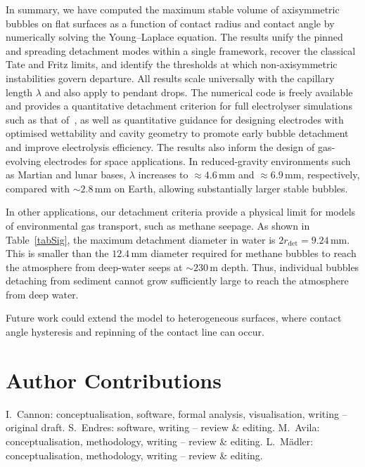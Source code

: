 \documentclass[9pt]{extarticle}
\begin{document}
In summary, we have computed the maximum stable volume of axisymmetric bubbles on flat surfaces as a function of contact radius and contact angle by numerically solving the Young--Laplace equation. The results unify the pinned and spreading detachment modes within a single framework, recover the classical Tate and Fritz limits, and identify the thresholds at which non-axisymmetric instabilities govern departure. All results scale universally with the capillary length $\lambda$ and also apply to pendant drops. The numerical code is freely available\cite{cannon26bubble} and provides a quantitative detachment criterion for full electrolyser simulations such as that of~\citet{ross26transient}, as well as quantitative guidance for designing electrodes with optimised wettability and cavity geometry to promote early bubble detachment and improve electrolysis efficiency\cite{raman25electrolytic,penas19decoupling}. The results also inform the design of gas-evolving electrodes for space applications. In reduced-gravity environments such as Martian and lunar bases, $\lambda$ increases to $\approx4.6\,\mathrm{mm}$ and $\approx6.9\,\mathrm{mm}$, respectively, compared with $\sim2.8\,\mathrm{mm}$ on Earth, allowing substantially larger stable bubbles.

In other applications, our detachment criteria provide a physical limit for models of environmental gas transport, such as methane seepage. As shown in Table~\ref{tabSig}, the maximum detachment diameter in water is $2r_\mathrm{det}=9.24\,\mathrm{mm}$. This is smaller than the $12.4\,\mathrm{mm}$ diameter required for methane bubbles to reach the atmosphere from deep-water seeps at $\sim230\,\mathrm{m}$ depth\cite{mcginnis06fate}. Thus, individual bubbles detaching from sediment cannot grow sufficiently large to reach the atmosphere from deep water.

Future work could extend the model to heterogeneous surfaces, where contact angle hysteresis and repinning of the contact line can occur.

\section*{Author Contributions}

I.~Cannon: conceptualisation, software, formal analysis, visualisation, writing -- original draft. S.~Endres: software, writing -- review \& editing. M.~Avila: conceptualisation, methodology, writing -- review \& editing. L.~M\"adler: conceptualisation, methodology, writing -- review \& editing.
\end{document}
